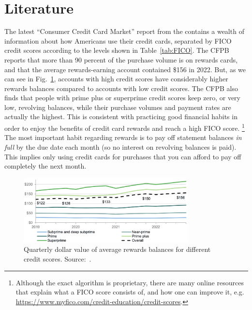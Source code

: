 \section{Literature} \label{sec:Literature}

The latest ``Consumer Credit Card Market'' report from the \citet{cfpb:2023} contains a wealth of information about how Americans use their credit cards, separated by FICO credit scores according to the levels shown in Table~\ref{tab:FICO}.
The CFPB reports that more than 90 percent of the purchase volume is on rewards cards, and that the average rewards-earning account contained \$156 in 2022. 
But, as we can see in Fig.~\ref{fig:CFPBRewardsBalances}, accounts with high credit scores have considerably higher rewards balances compared to accounts with low credit scores. 
The CFPB also finds that people with prime plus or superprime credit scores keep zero, or very low, revolving balances, while their purchase volumes and payment rates are actually the highest. 
This is consistent with practicing good financial habits in order to enjoy the benefits of credit card rewards and reach a high FICO score.%
\footnote{Although the exact algorithm is proprietary, there are many online resources that explain what a FICO score consists of, and how one can improve it, e.g. \url{https://www.myfico.com/credit-education/credit-scores}.}
The most important habit regarding rewards is to pay off statement balances \emph{in full} by the due date each month (so no interest on revolving balances is paid). This implies only using credit cards for purchases that you can afford to pay off completely the next month.



\begin{figure}[t!h]
    \begin{center}
    \includegraphics[width=0.8\textwidth]{../Misc/CFPBFig2_DollarPerAccount.png}
    \caption{Quarterly dollar value of average rewards balances for different credit scores. Source:~\citet{cfpb:2023}.}
    \label{fig:CFPBRewardsBalances}
    \end{center}
\end{figure}

